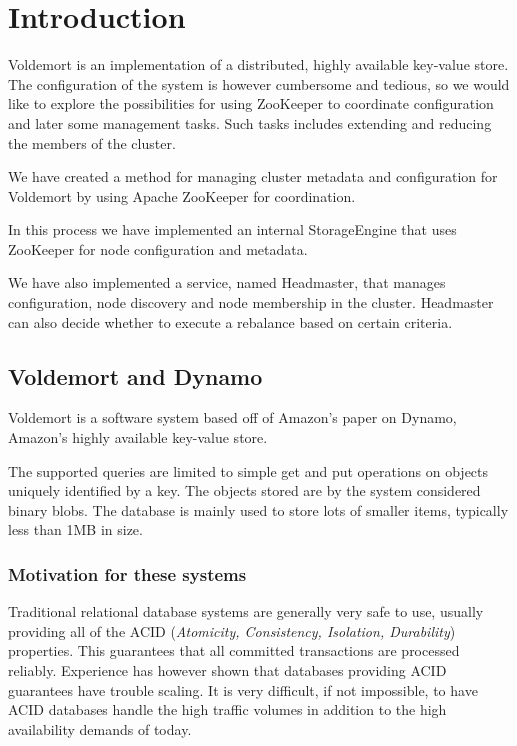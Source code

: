 
\section{Introduction}
Voldemort is an implementation of a distributed, highly available key-value store.
The configuration of the system is however cumbersome and tedious, so we would like to explore the possibilities for using ZooKeeper to coordinate configuration and later some management tasks.
Such tasks includes extending and reducing the members of the cluster.

We have created a method for managing cluster metadata and configuration for Voldemort by using Apache ZooKeeper for coordination.

In this process we have implemented an internal StorageEngine that uses ZooKeeper for node configuration and metadata.

We have also implemented a service, named Headmaster, that manages configuration, node discovery and node membership in the cluster.
Headmaster can also decide whether to execute a rebalance based on certain criteria.

\subsection{Voldemort and Dynamo}
Voldemort is a software system based off of Amazon's paper on Dynamo, Amazon's highly available key-value store\cite{dynamo}.

The supported queries are limited to simple get and put operations on objects uniquely identified by a key. 
The objects stored are by the system considered binary blobs.
The database is mainly used to store lots of smaller items, typically less than 1MB in size.

\subsubsection{Motivation for these systems}
Traditional relational database systems are generally very safe to use, usually providing all of the ACID (\emph{Atomicity, Consistency, Isolation, Durability}) properties.
This guarantees that all committed transactions are processed reliably.
Experience has however shown that databases providing ACID guarantees have trouble scaling. It is very difficult, if not impossible, to have ACID databases handle the high traffic volumes in addition to the high availability demands of today.

